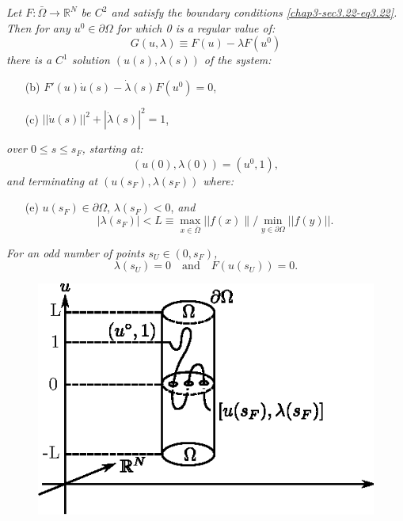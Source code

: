 {\em Let $F:\bar{\Omega}\to \mathbb{R}^N$ be $C^2$ and satisfy the
  boundary conditions \eqref{chap3-sec3.22-eq3.22}. Then for any $u^0
  \in \partial \Omega$ 
  for which 0 is a regular value of:}
\begin{equation*}
G(u, \lambda )\equiv F(u) - \lambda F(u^0)
\tag{3.24a}\label{chap3-sec3.24-eq3.24a} 
\end{equation*} 
{\em there is a $C^1$ solution $(u(s), \lambda (s))$ of the system:}
\begin{itemize}
\item[(b)] $F'(u) \dot{u} (s) - \dot{\lambda}(s) F(u^0) = 0$,
\item[(c)] $||  \dot{u} (s) ||^2 + |\dot{\lambda} (s)|^2 = 1$,
\end{itemize}
{\em over $0 \leq s \leq s_F$, starting at:}
\begin{equation*}
(u(0), \lambda (0)) = (u^0,1),\tag{3.24d}\label{chap3-sec3.24-eq3.24d}  
\end{equation*}
{\em and terminating at $(u(s_F),\lambda (s_F))$ where:}
\begin{itemize}
\item[(e)] $u(s_F) \in \partial \Omega$, $\lambda(s_F) <
0$, {\em and}\pageoriginale
\begin{equation*}
|\lambda (s_F) | < L \equiv \underset{x \in \bar{\Omega}} \max ||
f(x) \parallel / \underset{y \in \partial \Omega}\min || f(y)
||. \tag{3.24}\label{chap3-sec3.24-eq3.24}   
\end{equation*}   
\end{itemize}

{\em For an odd number of points $s_U \in (0, s_F)$,}
\begin{equation*}
\lambda (s_U) = 0\quad\text{and}\quad F(u(s_U)) =
0. \tag{3.24f}\label{chap3-sec3.24-eq3.24f}  
\end{equation*}

\begin{figure}[H]
\centering
\includegraphics{vol79-fig/fig79-23.eps}
\smallskip
\caption{}
\label{chap3-fig3.5} 
\end{figure}


